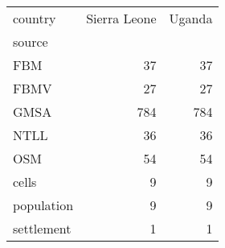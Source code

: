 \begin{tabular}{lrr}
\toprule
country &  Sierra Leone &  Uganda \\
source     &               &         \\
\midrule
FBM        &            37 &      37 \\
FBMV       &            27 &      27 \\
GMSA       &           784 &     784 \\
NTLL       &            36 &      36 \\
OSM        &            54 &      54 \\
cells      &             9 &       9 \\
population &             9 &       9 \\
settlement &             1 &       1 \\
\bottomrule
\end{tabular}

